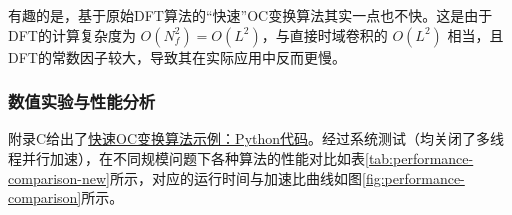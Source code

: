\begin{remark}
    有趣的是，基于原始DFT算法的“快速”OC变换算法其实一点也不快。这是由于DFT的计算复杂度为 $O(N_f^2)=O(L^2)$，与直接时域卷积的 $O(L^2)$ 相当，且DFT的常数因子较大，导致其在实际应用中反而更慢。
\end{remark}


\subsubsection{数值实验与性能分析}


附录C给出了\hyperref[chap:fast_oc_transform]{快速OC变换算法示例：Python代码}。经过系统测试（均关闭了多线程并行加速），在不同规模问题下各种算法的性能对比如表\ref{tab:performance-comparison-new}所示，对应的运行时间与加速比曲线如图\ref{fig:performance-comparison}所示。

